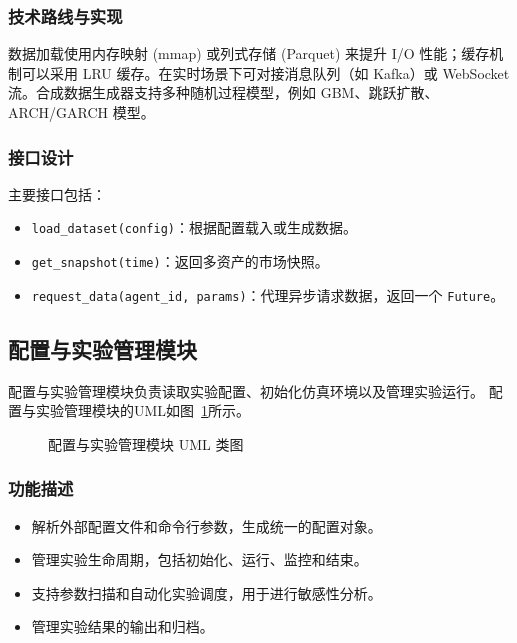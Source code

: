 \subsubsection{技术路线与实现}
数据加载使用内存映射 (mmap) 或列式存储 (Parquet) 来提升 I/O 性能；缓存机制可以采用 LRU 缓存。在实时场景下可对接消息队列（如 Kafka）或 WebSocket 流。合成数据生成器支持多种随机过程模型，例如 GBM、跳跃扩散、ARCH/GARCH 模型。

\subsubsection{接口设计}
主要接口包括：
\begin{itemize}
  \item \verb|load_dataset(config)|：根据配置载入或生成数据。
  \item \verb|get_snapshot(time)|：返回多资产的市场快照。
  \item \verb|request_data(agent_id, params)|：代理异步请求数据，返回一个 \verb|Future|。
\end{itemize}

\subsection{配置与实验管理模块}

配置与实验管理模块负责读取实验配置、初始化仿真环境以及管理实验运行。
配置与实验管理模块的UML如图~\ref{fig:uml_config}所示。

\begin{figure}[htbp]
  \centering
  \resizebox{0.25\linewidth}{!}{}
  \caption{配置与实验管理模块 UML 类图}
  \label{fig:uml_config}
\end{figure}

\subsubsection{功能描述}
\begin{itemize}
  \item 解析外部配置文件和命令行参数，生成统一的配置对象。
  \item 管理实验生命周期，包括初始化、运行、监控和结束。
  \item 支持参数扫描和自动化实验调度，用于进行敏感性分析。
  \item 管理实验结果的输出和归档。
\end{itemize}

